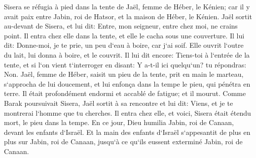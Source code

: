 \verse Sisera se réfugia à pied dans la tente de Jaël, femme de Héber, le Kénien; car il y avait paix entre Jabin, roi de Hatsor, et la maison de Héber, le Kénien. 
\verse Jaël sortit au-devant de Sisera, et lui dit: Entre, mon seigneur, entre chez moi, ne crains point. Il entra chez elle dans la tente, et elle le cacha sous une couverture. 
\verse Il lui dit: Donne-moi, je te prie, un peu d`eau à boire, car j`ai soif. Elle ouvrit l`outre du lait, lui donna à boire, et le couvrit. 
\verse Il lui dit encore: Tiens-toi à l`entrée de la tente, et si l`on vient t`interroger en disant: Y a-t-il ici quelqu`un? tu répondras: Non. 
\verse Jaël, femme de Héber, saisit un pieu de la tente, prit en main le marteau, s`approcha de lui doucement, et lui enfonça dans la tempe le pieu, qui pénétra en terre. Il était profondément endormi et accablé de fatigue; et il mourut. 
\verse Comme Barak poursuivait Sisera, Jaël sortit à sa rencontre et lui dit: Viens, et je te montrerai l`homme que tu cherches. Il entra chez elle, et voici, Sisera était étendu mort, le pieu dans la tempe. 
\verse En ce jour, Dieu humilia Jabin, roi de Canaan, devant les enfants d`Israël. 
\verse Et la main des enfants d`Israël s`appesantit de plus en plus sur Jabin, roi de Canaan, jusqu`à ce qu`ils eussent exterminé Jabin, roi de Canaan. 


